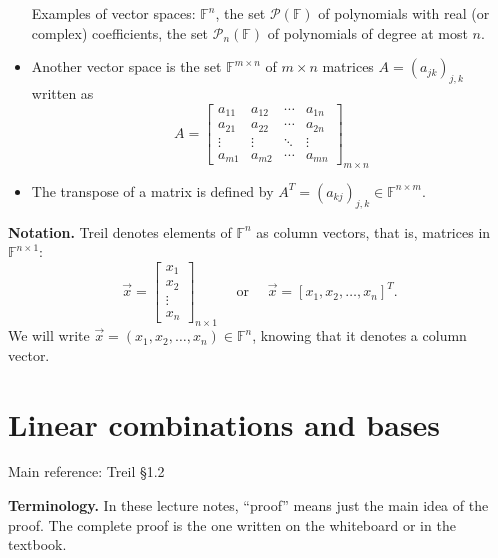 \documentclass[11pt]{article}
\newcommand{\1}{\mathbf{1}}
\newcommand{\0}{\mathbf{0}}
\newcommand{\F}{\mathbb{F}}
\newcommand{\cP}{\mathcal{P}}
\newcommand{\vx}{\vec{x}}
\begin{document}
\begin{itemize}
Examples of  vector spaces: $\mathbb{F}^n$, the set $\cP(\F)$ of polynomials with real (or complex) coefficients, the set $\cP_n(\F)$ of polynomials of degree at most $n$.

\item

Another vector space is the set $\F^{m \times n}$ of $m \times n$ matrices $A=(a_{jk})_{j,k}$ written as
\[
A = \left[
\begin{array}{cccc}
a_{11} & a_{12} & \cdots & a_{1n} \\
a_{21} & a_{22} & \cdots & a_{2n} \\
\vdots & \vdots & \ddots & \vdots \\
a_{m1} & a_{m2} & \cdots & a_{mn}
\end{array}
\right]_{m \times n}
\]

\item

The transpose of a matrix is defined by $A^T = (a_{kj})_{j,k} \in \F^{n \times m}$.

\end{itemize}

\textbf{Notation.}
Treil denotes elements of $\F^n$ as column vectors, that is, matrices in $\F^{n \times 1}$:
\[
\vx = \left[
\begin{array}{c}
x_1 \\ x_2 \\ \vdots \\ x_n
\end{array}
\right]_{n \times 1}
\quad
\text{ or }
\quad
\vx = [x_1, x_2, \dots, x_n]^T
.
\]
We will write $\vx = (x_1, x_2 , \dots , x_n) \in \F^n$, knowing that it denotes a column vector.



\clearpage
\section{Linear combinations and bases}

Main reference:
Treil \S1.2

\textbf{Terminology.}
In these lecture notes, ``proof'' means just the main idea of the proof.
The complete proof is the one written on the whiteboard or in the textbook.
\end{document}
